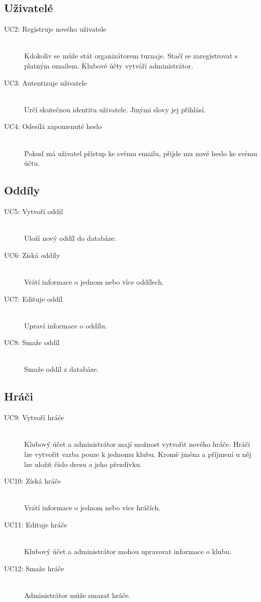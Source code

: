 \subsection*{Uživatelé}
  \begin{description}
    \item[UC2: Registruje nového uživatele] \hfill \\
    Kdokoliv se může stát organizátorem turnaje. Stačí se zaregistrovat s platným emailem.
    Klubové účty vytváří administrátor.
    \item[UC3: Autentizuje uživatele] \hfill \\
    Určí skutečnou identitu uživatele. Jinými slovy jej přihlásí.
    \item[UC4: Odesílá zapomenuté heslo] \hfill \\
    Pokud má uživatel přístup ke svému emailu, přijde mu nové heslo ke svému účtu.
  \end{description}

\subsection*{Oddíly}
  \begin{description}
    \item[UC5: Vytvoří oddíl] \hfill \\
    Uloží nový oddíl do databáze.
    \item[UC6: Získá oddíly] \hfill \\
    Vrátí informace o jednom nebo více oddílech.
    \item[UC7: Edituje oddíl] \hfill \\
    Upraví informace o oddílu.
    \item[UC8: Smaže oddíl] \hfill \\
    Smaže oddíl z databáze.
  \end{description}

\subsection*{Hráči}
  \begin{description}
    \item[UC9: Vytvoří hráče] \hfill \\
    Klubový účet a administrátor mají možnost vytvořit nového hráče. Hráči lze vytvořit vazba
    pouze k jednomu klubu. Kromě jména a příjmení u něj lze uložit číslo dresu a jeho přezdívku.
    \item[UC10: Získá hráče] \hfill \\
    Vrátí informace o jednom nebo více hráčích.
    \item[UC11: Edituje hráče] \hfill \\
    Klubový účet a administrátor mohou upravovat informace o klubu.
    \item[UC12: Smaže hráče] \hfill \\
    Administrátor může smazat hráče.
  \end{description}

